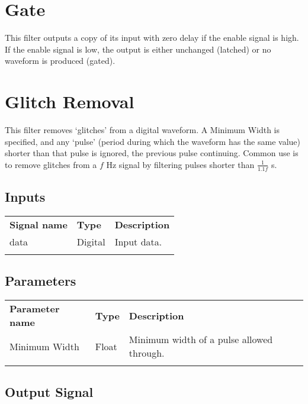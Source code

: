 \pagebreak
\section{Gate}

This filter outputs a copy of its input with zero delay if the enable signal is high. If the enable signal is low,
the output is either unchanged (latched) or no waveform is produced (gated).

\pagebreak
\section{Glitch Removal}

This filter removes `glitches' from a digital waveform. A Minimum Width is specified, and any `pulse' (period during which the waveform has the same value) shorter than that pulse is ignored, the previous pulse continuing. Common use is to remove glitches from a $f$ Hz signal by filtering pulses shorter than $\frac{1}{1.1f}$ s.

\subsection{Inputs}

\begin{tabularx}{16cm}{llX}
\thickhline
\textbf{Signal name} & \textbf{Type} & \textbf{Description} \\
\thickhline
data & Digital & Input data. \\
\thickhline
\end{tabularx}

\subsection{Parameters}

\begin{tabularx}{16cm}{llX}
\thickhline
\textbf{Parameter name} & \textbf{Type} & \textbf{Description} \\
\thickhline
Minimum Width & Float & Minimum width of a pulse allowed through.\\
\thickhline
\end{tabularx}

\subsection{Output Signal}

